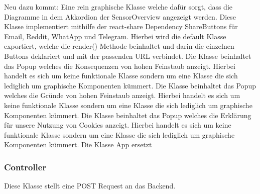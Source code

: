 Neu dazu kommt:
    Eine rein graphische Klasse welche dafür sorgt, dass die Diagramme in dem Akkordion der SensorOverview angezeigt werden.
    Diese Klasse implementiert mithilfe der react-share Dependency ShareButtons für Email, Reddit, WhatApp und Telegram.
    Hierbei wird die default Klasse exportiert, welche die render() Methode beinhaltet und darin die einzelnen Buttons deklariert und 
    mit der passenden URL verbindet.
    Die Klasse beinhaltet das Popup welches die Konsequenzen von hohen Feinstaub anzeigt. Hierbei handelt es sich um keine funktionale Klasse sondern um eine Klasse die sich
    lediglich um graphische Komponenten kümmert.
    Die Klasse beinhaltet das Popup welches die Gründe von hohen Feinstaub anzeigt. Hierbei handelt es sich um keine funktionale Klasse sondern um eine Klasse die sich
    lediglich um graphische Komponenten kümmert.
    Die Klasse beinhaltet das Popup welches die Erklärung für unsere Nutzung von Cookies anzeigt. Hierbei handelt es sich um keine funktionale Klasse sondern um eine Klasse die sich
    lediglich um graphische Komponenten kümmert.
    Die Klasse App ersetzt
\subsubsection{Controller}
    Diese Klasse stellt eine POST Request an das Backend.
